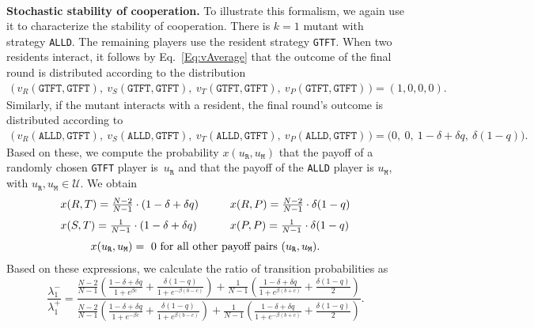 \documentclass[11pt]{article}
\def\alld{\texttt{ALLD}}
\def\gtft{\texttt{GTFT}}
\def\resident{\texttt{R}}
\def\mutant{\texttt{M}}
\theoremstyle{plainCl1}
\theoremstyle{plainCl2}
\begin{document}
~\\
{\bf Stochastic stability of cooperation.}
To illustrate this formalism, we again use it to characterize the stability of cooperation.  
There is $k\!=\!1$ mutant with strategy \alld{}. The remaining players use the resident strategy \gtft. 
When two residents interact, it follows by Eq.~\eqref{Eq:vAverage} that the outcome of the final round is distributed according to the distribution
\begin{align*}
\Big(\, v_R(\gtft,\gtft),~ v_S(\gtft,\gtft),~ v_T(\gtft,\gtft),~ v_P(\gtft,\gtft)\, \Big) = (1,0,0,0). 
\end{align*}
Similarly, if the mutant interacts with a resident, the final round's outcome is distributed according to 
\begin{align*}
\Big(\, v_R(\alld,\gtft),~ v_S(\alld,\gtft),~ v_T(\alld,\gtft),~ v_P(\alld,\gtft)\, \Big) = \big(0,~0,~1\!-\!\delta\!+\!\delta q,~\delta(1\! -\! q)\big). 
\end{align*}
Based on these, we compute the probability $x(u_\resident,u_\mutant)$ that the
payoff of a randomly chosen \gtft{} player is~\(u_\resident\) and that the payoff of the
\alld{} player is \(u_\mutant\), with $u_\resident,u_\mutant \!\in\!\mathcal{U}$. We obtain
\begin{equation*}  \setlength{\arraycolsep}{0.5cm}
\begin{array}{ll}
  x(R, T) =  \frac{N - 2}{N - 1} \cdot (1 - \delta + \delta q)
  &x(R, P) =  \frac{N - 2}{N - 1} \cdot \delta (1 - q) \\[0.25cm]
  x(S, T) =  \frac{1}{N - 1} \cdot (1 - \delta + \delta q) 
  &x(P, P) =  \frac{1}{N - 1} \cdot \delta (1 - q) \\[0.25cm]
  \multicolumn{2}{c}{x(u_\resident, u_\mutant) = ~0 \text{ for all other payoff pairs } (u_\resident, u_\mutant).}
  \end{array}
\end{equation*}
Based on these expressions, we calculate the ratio of transition probabilities as
\begin{equation*}
\frac{\lambda^{-}_1}{\lambda^{+}_1} = \frac{ \frac{N - 2}{N - 1}  
\left(\frac{ 1 - \delta + \delta q}{1+e^{ \beta c} } 
 + \frac{ \delta  \left(1 - q \right)}{1+ e^{-  \beta  \left(b - c \right)}} \right)  
 +  \frac{1}{N-1}  \left(\frac{1 - \delta + \delta q}{1 + e^{\beta  \left( b + c \right)}}
  + \frac{ \delta  \left(1 - q \right)}{2} \right)}
  { \frac{N - 2}{N - 1}  
\left( \frac{ 1 - \delta + \delta q}{1 + e^{-\beta c}}
+  \frac{ \delta  (1 - q)}{1 +e^{  \beta (b - c)}} \right) 
+  \frac{1}{N -1} \left(\frac{ 1 - \delta + \delta q}{1 + e^{-  \beta (b + c)}}
+  \frac{ \delta  \left(1 - q \right)}{2} \right)} .
\end{equation*}
\end{document}
